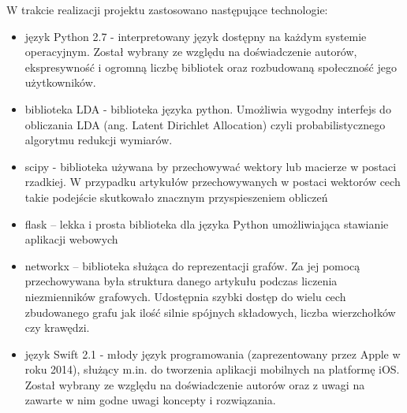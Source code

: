 W trakcie realizacji projektu zastosowano następujące technologie:
\begin{itemize}
  \item język Python 2.7 - interpretowany język dostępny na każdym systemie operacyjnym. Został wybrany ze względu na doświadczenie autorów, ekspresywność i ogromną liczbę bibliotek oraz rozbudowaną społeczność jego użytkowników.
 \item biblioteka LDA - biblioteka języka python. Umożliwia wygodny interfejs do obliczania LDA (ang. Latent Dirichlet Allocation) czyli probabilistycznego algorytmu redukcji wymiarów.
 \item scipy - biblioteka używana by przechowywać wektory lub macierze w postaci rzadkiej. W przypadku artykułów przechowywanych w postaci wektorów cech takie podejście skutkowało znacznym przyspieszeniem obliczeń
 
\item flask – lekka i prosta biblioteka dla języka Python umożliwiająca stawianie aplikacji webowych

\item networkx – biblioteka służąca do reprezentacji grafów. Za jej pomocą przechowywana była struktura danego artykułu podczas liczenia niezmienników grafowych. Udostępnia szybki dostęp do wielu cech zbudowanego grafu jak ilość silnie spójnych składowych, liczba wierzchołków czy krawędzi. 
 
\item język Swift 2.1 - młody język programowania (zaprezentowany przez Apple w roku 2014), służący m.in. do tworzenia aplikacji mobilnych na platformę iOS. Został wybrany ze względu 
na doświadczenie autorów oraz z uwagi na zawarte 
w nim godne uwagi koncepty i rozwiązania. 
\end{itemize}